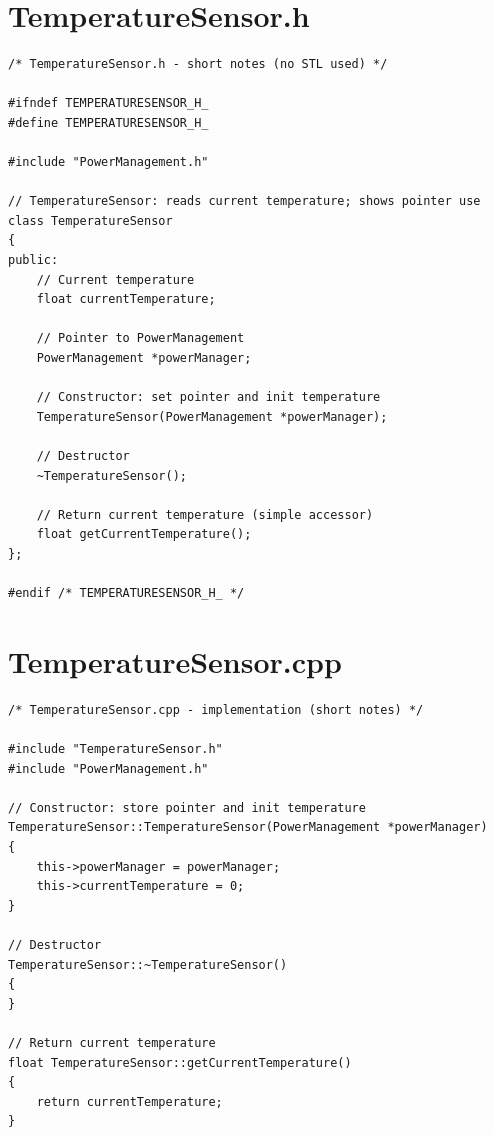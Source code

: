 \documentclass[11pt]{article}
\begin{document}
\section*{TemperatureSensor.h}
\begin{lstlisting}
/* TemperatureSensor.h - short notes (no STL used) */

#ifndef TEMPERATURESENSOR_H_
#define TEMPERATURESENSOR_H_

#include "PowerManagement.h"

// TemperatureSensor: reads current temperature; shows pointer use
class TemperatureSensor
{
public:
    // Current temperature
    float currentTemperature;

    // Pointer to PowerManagement
    PowerManagement *powerManager;

    // Constructor: set pointer and init temperature
    TemperatureSensor(PowerManagement *powerManager);

    // Destructor
    ~TemperatureSensor();

    // Return current temperature (simple accessor)
    float getCurrentTemperature();
};

#endif /* TEMPERATURESENSOR_H_ */
\end{lstlisting}

\section*{TemperatureSensor.cpp}
\begin{lstlisting}
/* TemperatureSensor.cpp - implementation (short notes) */

#include "TemperatureSensor.h"
#include "PowerManagement.h"

// Constructor: store pointer and init temperature
TemperatureSensor::TemperatureSensor(PowerManagement *powerManager)
{
    this->powerManager = powerManager;
    this->currentTemperature = 0;
}

// Destructor
TemperatureSensor::~TemperatureSensor()
{
}

// Return current temperature
float TemperatureSensor::getCurrentTemperature()
{
    return currentTemperature;
}
\end{lstlisting}
\end{document}
